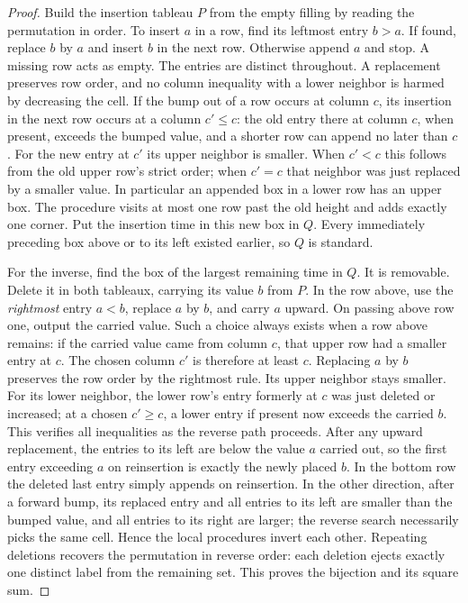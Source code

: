 \begin{proof}
Build the insertion tableau \(P\) from the empty filling by reading
the permutation in order. To insert \(a\) in a row, find its leftmost
entry \(b>a\). If found, replace \(b\) by \(a\) and insert \(b\) in the
next row. Otherwise append \(a\) and stop. A missing row acts as empty.
The entries are distinct throughout. A replacement preserves row order,
and no column inequality with a lower neighbor is harmed by decreasing
the cell. If the bump out of a row occurs at column \(c\), its insertion
in the next row occurs at a column \(c'\le c\): the old entry there at
column \(c\), when present, exceeds the bumped value, and a shorter row
can append no later than \(c\). For the new entry at \(c'\) its upper
neighbor is smaller. When \(c'<c\) this follows from the old upper row's
strict order; when \(c'=c\) that neighbor was just replaced by a smaller
value. In particular an appended box in a lower row has an upper box.
The procedure visits at most one row past the old height and adds exactly
one corner. Put the insertion time in this new box in \(Q\). Every
immediately preceding box above or to its left existed earlier, so \(Q\)
is standard.

For the inverse, find the box of the largest remaining time in \(Q\).
It is removable. Delete it in both tableaux, carrying its value \(b\)
from \(P\). In the row above, use the \emph{rightmost} entry \(a<b\),
replace \(a\) by \(b\), and carry \(a\) upward. On passing above row
one, output the carried value. Such a choice always exists when a row
above remains: if the carried value came from column \(c\), that upper
row had a smaller entry at \(c\). The chosen column \(c'\) is therefore
at least \(c\). Replacing \(a\) by \(b\) preserves the row order by
the rightmost rule. Its upper neighbor stays smaller. For its lower
neighbor, the lower row's entry formerly at \(c\) was just deleted or
increased; at a chosen \(c'\ge c\), a lower entry if present now exceeds
the carried \(b\). This verifies all inequalities as the reverse path
proceeds. After any upward replacement, the entries to its left are
below the value \(a\) carried out, so the first entry exceeding \(a\) on
reinsertion is exactly the newly placed \(b\). In the bottom row the
deleted last entry simply appends on reinsertion. In the other direction,
after a forward bump, its replaced entry and all entries to its left
are smaller than the bumped value, and all entries to its right are
larger; the reverse search necessarily picks the same cell. Hence the
local procedures invert each other. Repeating deletions recovers the
permutation in reverse order: each deletion ejects exactly one distinct
label from the remaining set. This proves the bijection and its square sum.


\end{proof}
